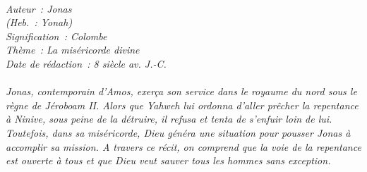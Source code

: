 \BFont
\noindent\hrulefill
{\footnotesize
\textit{
\bigskip
{\centering{}
\\Auteur~: Jonas
\\(Heb.~: Yonah)
\\Signification~: Colombe
\\Thème~: La miséricorde divine
\\Date de rédaction~: 8 siècle av. J.-C.\\}
}
\textit{
\\Jonas, contemporain d'Amos, exerça son service dans le royaume du nord sous le règne de Jéroboam II. Alors que Yahweh lui ordonna d'aller prêcher la repentance à Ninive, sous peine de la détruire, il refusa et tenta de s'enfuir loin de lui. Toutefois, dans sa miséricorde, Dieu généra une situation pour pousser Jonas à accomplir sa mission. A travers ce récit, on comprend que la voie de la repentance est ouverte à tous et que Dieu veut sauver tous les hommes sans exception.\bigskip
}
}
\par\nobreak\noindent\hrulefill
